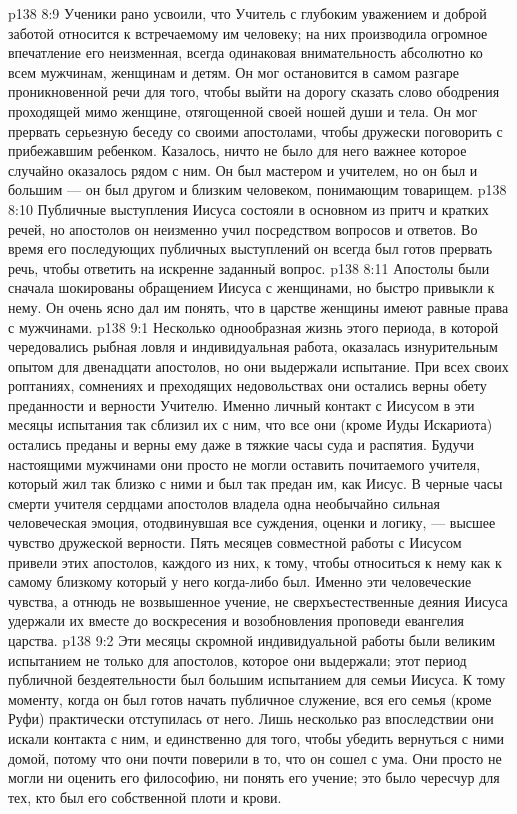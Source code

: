 \vs p138 8:9 Ученики рано усвоили, что Учитель с глубоким уважением и доброй заботой относится к  встречаемому им человеку; на них производила огромное впечатление его неизменная, всегда одинаковая внимательность абсолютно ко всем мужчинам, женщинам и детям. Он мог остановится в самом разгаре проникновенной речи для того, чтобы выйти на дорогу сказать слово ободрения проходящей мимо женщине, отягощенной своей ношей души и тела. Он мог прервать серьезную беседу со своими апостолами, чтобы дружески поговорить с прибежавшим ребенком. Казалось, ничто не было для него важнее  которое случайно оказалось рядом с ним. Он был мастером и учителем, но он был и большим --- он был другом и близким человеком, понимающим товарищем.
\vs p138 8:10 \pc Публичные выступления Иисуса состояли в основном из притч и кратких речей, но апостолов он неизменно учил посредством вопросов и ответов. Во время его последующих публичных выступлений он всегда был готов прервать речь, чтобы ответить на искренне заданный вопрос.
\vs p138 8:11 Апостолы были сначала шокированы обращением Иисуса с женщинами, но быстро привыкли к нему. Он очень ясно дал им понять, что в царстве женщины имеют равные права с мужчинами.
\vs p138 9:1 Несколько однообразная жизнь этого периода, в которой чередовались рыбная ловля и индивидуальная работа, оказалась изнурительным опытом для двенадцати апостолов, но они выдержали испытание. При всех своих роптаниях, сомнениях и преходящих недовольствах они остались верны обету преданности и верности Учителю. Именно личный контакт с Иисусом в эти месяцы испытания так сблизил их с ним, что все они (кроме Иуды Искариота) остались преданы и верны ему даже в тяжкие часы суда и распятия. Будучи настоящими мужчинами они просто не могли оставить почитаемого учителя, который жил так близко с ними и был так предан им, как Иисус. В черные часы смерти учителя сердцами апостолов владела одна необычайно сильная человеческая эмоция, отодвинувшая все суждения, оценки и логику, --- высшее чувство дружеской верности. Пять месяцев совместной работы с Иисусом привели этих апостолов, каждого из них, к тому, чтобы относиться к нему как к самому близкому  который у него когда\hyp{}либо был. Именно эти человеческие чувства, а отнюдь не возвышенное учение, не сверхъестественные деяния Иисуса удержали их вместе до воскресения и возобновления проповеди евангелия царства.
\vs p138 9:2 Эти месяцы скромной индивидуальной работы были великим испытанием не только для апостолов, которое они выдержали; этот период публичной бездеятельности был большим испытанием для семьи Иисуса. К тому моменту, когда он был готов начать публичное служение, вся его семья (кроме Руфи) практически отступилась от него. Лишь несколько раз впоследствии они искали контакта с ним, и единственно для того, чтобы убедить вернуться с ними домой, потому что они почти поверили в то, что он сошел с ума. Они просто не могли ни оценить его философию, ни понять его учение; это было чересчур для тех, кто был его собственной плоти и крови.
